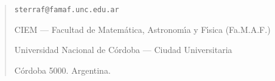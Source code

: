 \documentclass[11pt,english]{article}
\begin{document}



\bigskip

\begin{small}
  \begin{quote}
    \texttt{sterraf@famaf.unc.edu.ar}
    
    CIEM --- Facultad de Matem\'atica, Astronom\'{\i}a y F\'{\i}sica 
    (Fa.M.A.F.) 
    
    Universidad Nacional de C\'ordoba --- Ciudad Universitaria
    
    C\'ordoba 5000. Argentina.
  \end{quote}
\end{small}
\end{document}
